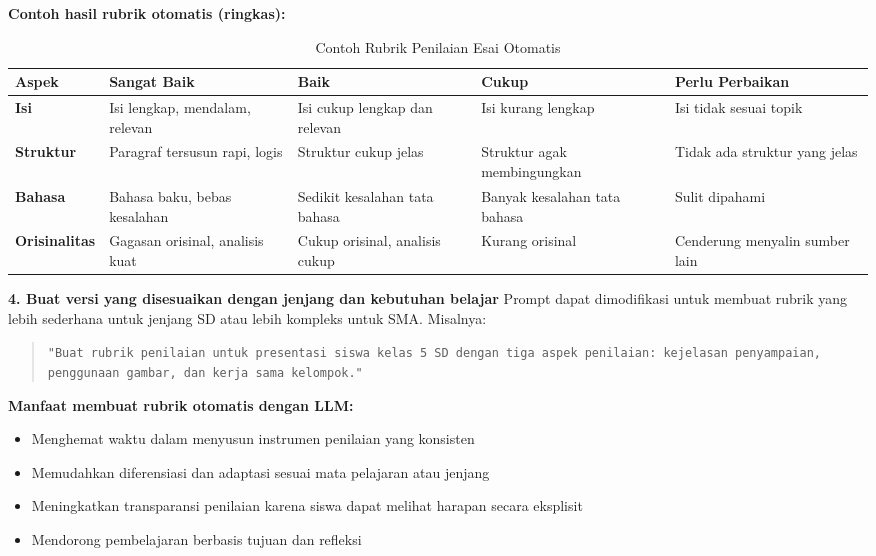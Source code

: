 \textbf{Contoh hasil rubrik otomatis (ringkas):}

\begin{table}
	\centering
	\renewcommand{\arraystretch}{1.4}
	\begin{tabularx}{\textwidth}{|l|X|X|X|X|}
		\hline
		\textbf{Aspek} & \textbf{Sangat Baik} & \textbf{Baik} & \textbf{Cukup} & \textbf{Perlu Perbaikan} \\
		\hline
		\textbf{Isi} & Isi lengkap, mendalam, relevan & Isi cukup lengkap dan relevan & Isi kurang lengkap & Isi tidak sesuai topik \\
		\hline
		\textbf{Struktur} & Paragraf tersusun rapi, logis & Struktur cukup jelas & Struktur agak membingungkan & Tidak ada struktur yang jelas \\
		\hline
		\textbf{Bahasa} & Bahasa baku, bebas kesalahan & Sedikit kesalahan tata bahasa & Banyak kesalahan tata bahasa & Sulit dipahami \\
		\hline
		\textbf{Orisinalitas} & Gagasan orisinal, analisis kuat & Cukup orisinal, analisis cukup & Kurang orisinal & Cenderung menyalin sumber lain \\
		\hline
	\end{tabularx}
	\caption{Contoh Rubrik Penilaian Esai Otomatis}
	\label{tab:rubrik-esai}
\end{table}

\textbf{4. Buat versi yang disesuaikan dengan jenjang dan kebutuhan belajar}  
Prompt dapat dimodifikasi untuk membuat rubrik yang lebih sederhana untuk jenjang SD atau lebih kompleks untuk SMA. Misalnya:

\begin{quote}
	\centering
	\texttt{"Buat rubrik penilaian untuk presentasi siswa kelas 5 SD dengan tiga aspek penilaian: kejelasan penyampaian, penggunaan gambar, dan kerja sama kelompok."}
\end{quote}

\textbf{Manfaat membuat rubrik otomatis dengan LLM:}
\begin{itemize}
	\item Menghemat waktu dalam menyusun instrumen penilaian yang konsisten
	\item Memudahkan diferensiasi dan adaptasi sesuai mata pelajaran atau jenjang
	\item Meningkatkan transparansi penilaian karena siswa dapat melihat harapan secara eksplisit
	\item Mendorong pembelajaran berbasis tujuan dan refleksi
\end{itemize}

